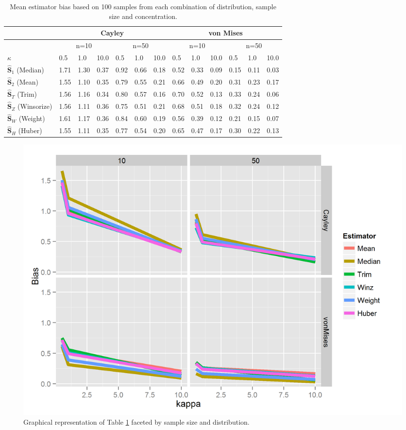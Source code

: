 \documentclass{article}\usepackage[]{graphicx}\usepackage[]{color}
\newcommand{\ProjMean}{{\widehat{\bm S}_{2}}}
\newcommand{\ProjMedian}{{\widehat{\bm S}_{1}}}
\newcommand{\HuberMean}{{\widehat{\bm S}_H}}
\newcommand{\WeightMean}{{\widehat{\bm S}_W}}
\newcommand{\TrimMean}{{\widehat{\bm S}_T}}
\newcommand{\WinzMean}{{\widehat{\bm S}_Z}}
\begin{document}
\begin{table}[ht]
\centering
\begin{tabular}{l|lll|lll|lll|lll}
  \hline
 & \multicolumn{6}{|c|}{Cayley} & \multicolumn{6}{|c}{von Mises}   \\ 
\hline
   &  \multicolumn{3}{|c|}{n=10} & \multicolumn{3}{|c|}{n=50} & \multicolumn{3}{|c|}{n=10} & \multicolumn{3}{|c}{n=50} \\ 
  $\kappa$ &  0.5 &  1.0 & 10.0 &  0.5 &  1.0 & 10.0 &  0.5 &  1.0 & 10.0 &  0.5 &  1.0 & 10.0 \\ \hline
  $\ProjMedian$ (Median) & 1.71 & 1.30 & 0.37 & 0.92 & 0.66 & 0.18 & 0.52 & 0.33 & 0.09 & 0.15 & 0.11 & 0.03 \\ 
  $\ProjMean$ (Mean) & 1.55 & 1.10 & 0.35 & 0.79 & 0.55 & 0.21 & 0.66 & 0.49 & 0.20 & 0.31 & 0.23 & 0.17 \\ 
  $\TrimMean$ (Trim) & 1.56 & 1.16 & 0.34 & 0.80 & 0.57 & 0.16 & 0.70 & 0.52 & 0.13 & 0.33 & 0.24 & 0.06 \\ 
  $\WinzMean$ (Winsorize)& 1.56 & 1.11 & 0.36 & 0.75 & 0.51 & 0.21 & 0.68 & 0.51 & 0.18 & 0.32& 0.24 & 0.12 \\ 
  $\WeightMean$ (Weight) & 1.61 & 1.17 & 0.36 & 0.84 & 0.60 & 0.19& 0.56 & 0.39 & 0.12 & 0.21 & 0.15 & 0.07\\ 
  $\HuberMean$ (Huber) & 1.55 & 1.11 & 0.35 & 0.77 & 0.54 & 0.20 & 0.65 & 0.47 & 0.17 & 0.30 & 0.22 & 0.13 \\ 
   \hline
\end{tabular}
\caption{Mean estimator bias based on 100 samples from each combination of distribution, sample size and concentration.}
\label{tab:SimRes}
\end{table}

\begin{figure}
\centering
\includegraphics[width=.7\textwidth]{Estimator.png}
\caption{Graphical representation of Table \ref{tab:SimRes} faceted by sample size and distribution.}
\end{figure}
\end{document}
